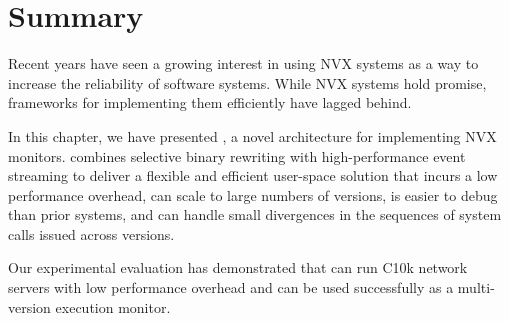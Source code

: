 \section{Summary}
\label{efficient-execution:summary}

Recent years have seen a growing interest in using NVX systems as a way to
increase the reliability of software systems. While NVX systems hold promise,
frameworks for implementing them efficiently have lagged behind.

In this chapter, we have presented \varan, a novel architecture for
implementing NVX monitors. \varan combines selective binary rewriting with
high-performance event streaming to deliver a flexible and efficient user-space
solution that incurs a low performance overhead, can scale to large numbers of
versions, is easier to debug than prior systems, and can handle small
divergences in the sequences of system calls issued across versions.

Our experimental evaluation has demonstrated that \varan can run C10k network
servers with low performance overhead and can be used successfully as a
multi-version execution monitor.
